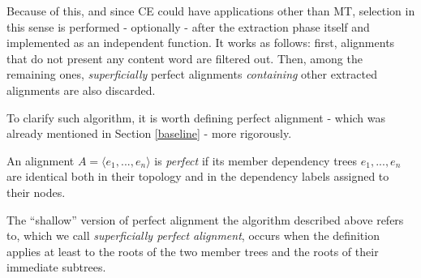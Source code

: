Because of this, and since CE could have applications other than MT, selection in this sense is performed - optionally - after the extraction phase itself and implemented as an independent function. It works as follows: first, alignments that do not present any content word are filtered out. Then, among the remaining ones, \textit{superficially} perfect alignments \textit{containing} other extracted alignments are also discarded.\smallskip

To clarify such algorithm, it is worth defining perfect alignment - which was already mentioned in Section \ref{baseline} - more rigorously. \smallskip

\begin{definition}
    An alignment $A = \langle e_1,...,e_n \rangle$ is \textit{perfect} if its member dependency trees $e_1,...,e_n$ are identical both in their topology and in the dependency labels assigned to their nodes. 
\end{definition} \smallskip

The ``shallow'' version of perfect alignment the algorithm described above refers to, which we call \textit{superficially perfect alignment}, occurs when the definition applies at least to the roots of the two member trees and the roots of their immediate subtrees.\smallskip  

